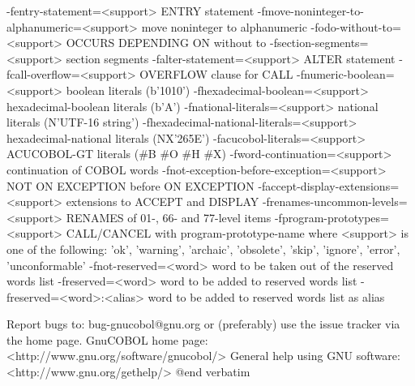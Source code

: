   -fentry-statement=<support> ENTRY statement
  -fmove-noninteger-to-alphanumeric=<support> move noninteger to alphanumeric
  -fodo-without-to=<support> OCCURS DEPENDING ON without to
  -fsection-segments=<support> section segments
  -falter-statement=<support> ALTER statement
  -fcall-overflow=<support> OVERFLOW clause for CALL
  -fnumeric-boolean=<support> boolean literals (b'1010')
  -fhexadecimal-boolean=<support> hexadecimal-boolean literals (b'A')
  -fnational-literals=<support> national literals (N'UTF-16 string')
  -fhexadecimal-national-literals=<support> hexadecimal-national literals (NX'265E')
  -facucobol-literals=<support> ACUCOBOL-GT literals (#B #O #H #X)
  -fword-continuation=<support> continuation of COBOL words
  -fnot-exception-before-exception=<support> NOT ON EXCEPTION before ON EXCEPTION
  -faccept-display-extensions=<support> extensions to ACCEPT and DISPLAY
  -frenames-uncommon-levels=<support> RENAMES of 01-, 66- and 77-level items
  -fprogram-prototypes=<support> CALL/CANCEL with program-prototype-name
	where <support> is one of the following:
	'ok', 'warning', 'archaic', 'obsolete', 'skip', 'ignore', 'error', 'unconformable'
  -fnot-reserved=<word> word to be taken out of the reserved words list
  -freserved=<word>     word to be added to reserved words list
  -freserved=<word>:<alias> word to be added to reserved words list as alias


Report bugs to: bug-gnucobol@gnu.org
or (preferably) use the issue tracker via the home page.
GnuCOBOL home page: <http://www.gnu.org/software/gnucobol/>
General help using GNU software: <http://www.gnu.org/gethelp/>
@end verbatim

